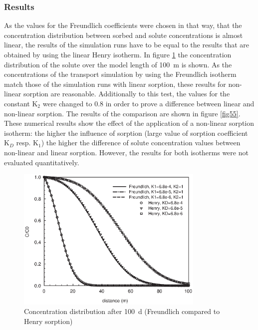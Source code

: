 \subsubsection*{Results}

As the values for the Freundlich coefficients were chosen in that way, that the concentration distribution between sorbed and solute concentrations is almost linear, the results of the simulation runs have to be equal to the results that are obtained by using the linear Henry isotherm. In figure \ref{fig54} the concentration distribution of the solute over the model length of 100~m is shown. As the concentrations of the transport simulation by using the Freundlich isotherm match those of the simulation runs with linear sorption, these results for non-linear sorption are reasonable. Additionally to this test, the values for the constant K$_2$ were changed to 0.8 in order to prove a difference between linear and non-linear sorption. The results of the comparison are shown in figure \ref{fig55}. These numerical results show the effect of the application of a non-linear sorption isotherm: the higher the influence of sorption (large value of sorption coefficient K$_D$ resp. K$_1$) the higher the difference of solute concentration values between non-linear and linear sorption. However, the results for both isotherms were not evaluated quantitatively.

\begin{figure}[htbp]
\centering
\includegraphics[width=0.8\textwidth]{C/figures/fig54.EPS}
\caption{Concentration distribution after 100~d (Freundlich compared to Henry sorption)}
\label{fig54}
\end{figure}

